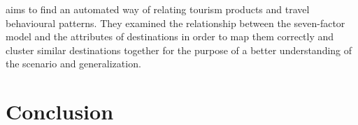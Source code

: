 \cite{sertkan2018mapping} aims to find an automated way of relating tourism products and travel behavioural patterns. They examined the relationship between the seven-factor model\cite{neidhardt2015picture}   and the attributes of destinations in order to map them correctly and cluster similar destinations together for the purpose of a better understanding of the scenario and generalization.


  
\section{Conclusion}




